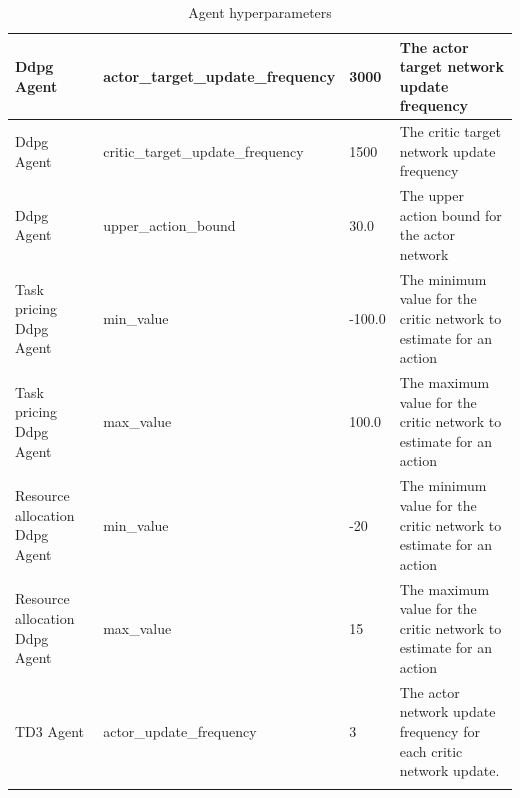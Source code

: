 \begin{longtable}{|p{3.5cm}|p{5cm}|p{3.5cm}|p{3.5cm}|}
        Ddpg Agent & actor\_target\_update\_frequency & 3000 & The actor target network update frequency \\ \hline
        Ddpg Agent & critic\_target\_update\_frequency & 1500 & The critic target network update frequency \\ \hline
        Ddpg Agent & upper\_action\_bound & 30.0 & The upper action bound for the actor network \\ \hline \hline
        Task pricing Ddpg Agent & min\_value & -100.0 & The minimum value for the critic network to estimate for an
            action \\ \hline
        Task pricing Ddpg Agent & max\_value & 100.0 & The maximum value for the critic network to estimate for an
            action\\ \hline \hline
        Resource allocation Ddpg Agent & min\_value & -20 & The minimum value for the critic network to estimate for an
            action \\ \hline
        Resource allocation Ddpg Agent & max\_value & 15 & The maximum value for the critic network to estimate for an
            action\\ \hline \hline
        TD3 Agent & actor\_update\_frequency & 3 & The actor network update frequency for each critic network update. \\ \hline
    \caption{Agent hyperparameters}
    \label{tab:agent_hyperparameters}
\end{longtable}


